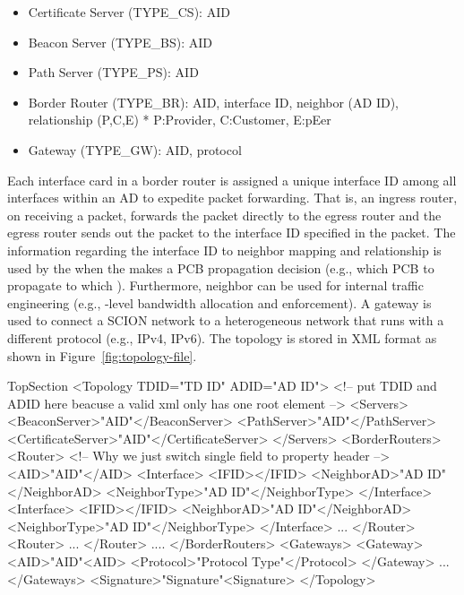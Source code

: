 \begin{itemize}
\item Certificate Server (TYPE\_CS): AID 
\item Beacon Server (TYPE\_BS): AID
\item Path Server (TYPE\_PS): AID
\item Border Router (TYPE\_BR): AID, interface ID, neighbor \AD (AD ID), \AD relationship (P,C,E)\newline
	* P:Provider, C:Customer, E:pEer
\item Gateway (TYPE\_GW): AID, protocol 
\end{itemize}
Each interface card in a border router is assigned a unique interface ID among all interfaces within an AD to expedite packet forwarding. That is, an ingress router, on receiving a packet, forwards the packet directly to the egress router and the egress router sends out the packet to the interface ID specified in the packet. The information regarding the interface ID to neighbor \AD mapping and \AD relationship is used by the \BS when the \BS makes a PCB propagation decision (e.g., which PCB to propagate to which \AD). Furthermore, neighbor \AD can be used for internal traffic engineering (e.g., \AD-level bandwidth allocation and enforcement). A gateway is used to connect a SCION network to a heterogeneous network that runs with a different protocol (e.g., IPv4, IPv6). 
The \AD topology is stored in XML format as shown in Figure~\ref{fig:topology-file}.


\begin{SaveVerbatim}{TopSection}
<Topology TDID="TD ID" ADID="AD ID">	
<!-- put TDID and ADID here beacuse a valid xml only has one root element -->
	<Servers>
		<BeaconServer>"AID"</BeaconServer>
		<PathServer>"AID"</PathServer>
		<CertificateServer>"AID"</CertificateServer>
	</Servers>
	<BorderRouters>
		<Router>	
		<!-- Why we just switch single field to property header -->
			<AID>"AID"</AID>
			<Interface>
				<IFID></IFID>
				<NeighborAD>"AD ID"</NeighborAD>
				<NeighborType>"AD ID"</NeighborType>
			</Interface>
			<Interface>
				<IFID></IFID>
				<NeighborAD>"AD ID"</NeighborAD>
				<NeighborType>"AD ID"</NeighborType>
			</Interface>
				...
		</Router>
		<Router>
			...
		</Router>
			....
	</BorderRouters>
	<Gateways>
		<Gateway>
			<AID>"AID"<AID>
			<Protocol>"Protocol Type"</Protocol>
		</Gateway>
			...
	</Gateways>
	<Signature>"Signature"<Signature>
</Topology>
\end{SaveVerbatim}

